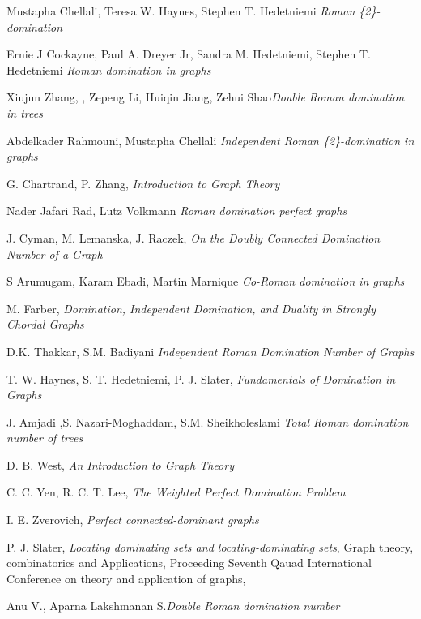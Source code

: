 \begin{thebibliography}{1}\label{bibliography}
Mustapha Chellali, Teresa W. Haynes, Stephen T. Hedetniemi \textit{Roman \{2\}-domination}
	
Ernie J Cockayne, Paul A. Dreyer Jr, Sandra M. Hedetniemi, Stephen T. Hedetniemi \textit{Roman domination in graphs}

Xiujun Zhang, , Zepeng Li, Huiqin Jiang, Zehui Shao\textit{Double Roman domination in trees} 

Abdelkader Rahmouni, Mustapha Chellali \textit{Independent Roman \{2\}-domination in graphs}

G. Chartrand, P. Zhang, \textit{Introduction to Graph Theory}

Nader Jafari Rad, Lutz Volkmann \textit{Roman domination perfect graphs}

J. Cyman, M. Lemanska, J. Raczek, \textit{On the Doubly Connected Domination Number of a Graph}

S Arumugam, Karam Ebadi, Martin Marnique \textit{Co-Roman domination in graphs}

M. Farber, \textit{Domination, Independent Domination, and Duality in Strongly Chordal Graphs}

D.K. Thakkar, S.M. Badiyani \textit{Independent Roman Domination Number of Graphs}

T. W. Haynes, S. T. Hedetniemi, P. J. Slater, \textit{Fundamentals of Domination in Graphs}

J. Amjadi ,S. Nazari-Moghaddam, S.M. Sheikholeslami \textit{Total Roman domination number of trees}

D. B. West, \textit{An Introduction to Graph Theory}

C. C. Yen, R. C. T. Lee, \textit{The Weighted Perfect Domination Problem}

I. E. Zverovich, \textit{Perfect connected-dominant graphs}

P. J. Slater, \textit{Locating dominating sets and locating-dominating sets}, Graph theory, combinatorics and Applications, Proceeding Seventh Qauad International Conference on theory and application of graphs,

Anu V., Aparna Lakshmanan S.\textit{Double Roman domination number}


\end{thebibliography}
